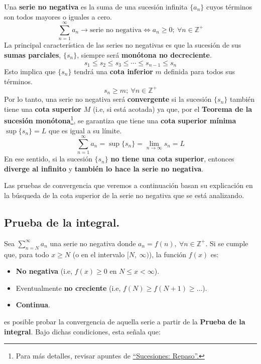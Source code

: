\documentclass[12pt]{article}
\begin{document}
Una \textbf{serie no negativa} es la suma de una sucesión infinita $\{a_{n}\}$ cuyos términos son todos mayores o iguales a cero.
\[
  \sum_{n = 1}^{\infty} a_{n} \rightarrow \text{serie no negativa} \iff a_{n} \geq 0; \ \forall n \in \mathbb{Z}^{+}
\]
La principal característica de las series no negativas es que la sucesión de sus \textbf{sumas parciales}, $\{s_{n}\}$, siempre será \textbf{monótona no decreciente}.
\[
  s_{1} \leq s_{2} \leq s_{3} \leq \cdots  \leq s_{n - 1} \leq s_{n}
\]
Esto implica que $\{s_{n}\}$ tendrá una \textbf{cota inferior} $m$ definida para todos sus términos.
\[
  s_{n} \geq m; \ \forall n \in \mathbb{Z}^{+}
\]
Por lo tanto, una serie no negativa será \textbf{convergente} si la sucesión $\{s_{n}\}$ también tiene una \textbf{cota superior} $M$ (i.e, si está acotada) ya que, por el \textbf{Teorema de la sucesión monótona}\footnote{Para más detalles, revisar apuntes de \href{/sucesiones-repaso/sucesiones-repaso.pdf}{``Sucesiones: Repaso''.}}, se garantiza que tiene una \textbf{cota superior mínima} $\sup\{s_{n}\} = L$ que es igual a su límite.
\[
  \sum_{n = 1}^{\infty} a_{n} = \sup\{s_{n}\} = \lim_{n \to \infty} s_{n} = L
\]
En ese sentido, si la sucesión $\{s_{n}\}$ \textbf{no tiene una cota superior}, entonces \textbf{diverge al infinito} y \textbf{también lo hace la serie no negativa}.

Las pruebas de convergencia que veremos a continuación basan su explicación en la búsqueda de la cota superior de la serie no negativa que se está analizando.

\subsection{Prueba de la integral.}

Sea $\sum_{n = N}^{\infty} a_{n}$ una serie no negativa donde $a_{n} = f(n), \ \forall n \in \mathbb{Z}^{+}$. Si se cumple que, para todo $x \geq N$ (o en el intervalo $[N, \ \infty)$), la función $f(x)$ es:

\begin{itemize}
\item \textbf{No negativa} (i.e, $f(x) \geq 0$ en $N \leq x < \infty$).
\item Eventualmente \textbf{no creciente} (i.e, $f(N) \geq f(N + 1) \geq \ldots$).
\item \textbf{Continua}.
\end{itemize}

es posible probar la convergencia de aquella serie a partir de la \textbf{Prueba de la integral}. Bajo dichas condiciones, esta señala que:
\end{document}
